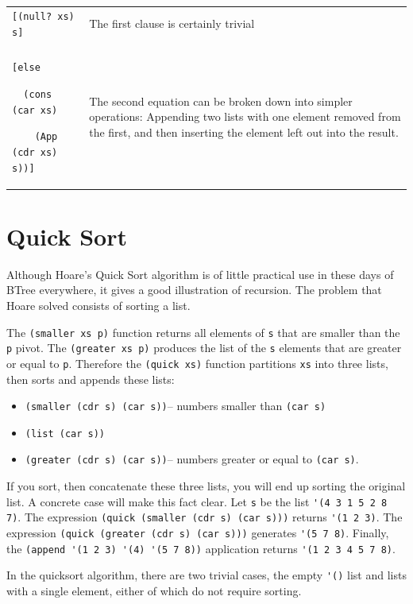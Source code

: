 \documentclass[a4paper,12pt]{book}
\begin{document}
\verb||\\
\begin{tabular}{p{5cm}p{7cm}}
\verb|[(null? xs) s]| & The first clause is certainly trivial\\
\\
\verb|[else |

\verb|  (cons (car xs)|

\verb|    (App (cdr xs) s))]|
& The second equation can be
broken down into simpler
operations: Appending two
lists with one element
removed from the first,
and then inserting the element
left out into the result.\\
\end{tabular}


\section{Quick Sort}
Although Hoare's Quick Sort algorithm is
of little practical use in these days of BTree everywhere, it gives a good illustration
of recursion. The problem that Hoare solved consists of sorting a list.

The \verb|(smaller xs p)| function returns
all elements of \verb|s| that are smaller
than the \verb|p| pivot. 
The \verb|(greater xs p)| produces the
list of the \verb|s| elements that are
greater or equal to \verb|p|. Therefore the
\verb|(quick xs)| function partitions 
\verb|xs| into three lists, then sorts
and appends these lists:
\begin{itemize}
\item \verb|(smaller (cdr s) (car s))|--
numbers smaller than \verb|(car s)|
\item \verb|(list (car s))| 
\item \verb|(greater (cdr s) (car s))|--
numbers greater or equal to \verb|(car s)|.
\end{itemize}
If you sort, then concatenate these three lists,
you will end up sorting the original list.
A concrete case will make this fact clear.
Let \verb|s| be the list \verb|'(4 3 1 5 2 8 7)|.
The expression
\verb|(quick (smaller (cdr s) (car s)))|
returns \verb|'(1 2 3)|.
The expression
\verb|(quick (greater (cdr s) (car s)))|
generates \verb|'(5 7 8)|. Finally, 
the 
\verb|(append '(1 2 3) '(4) '(5 7 8))|
application
returns \verb|'(1 2 3 4 5 7 8)|.

In the quicksort algorithm,
there are two trivial cases,
the empty \verb|'()| list
and lists with a single element,
either of which
do not require sorting.
\end{document}
